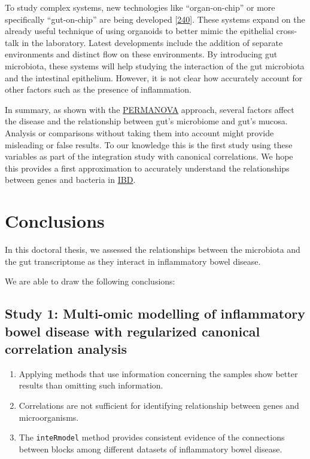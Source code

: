 \documentclass[
  12pt,
  a4paper,
  twoside,
  openright]{book}
\providecommand{\tightlist}{%
  \setlength{\itemsep}{0pt}\setlength{\parskip}{0pt}}
\begin{document}
To study complex systems, new technologies like ``organ-on-chip'' or more specifically ``gut-on-chip'' are being developed {[}\protect\hyperlink{ref-collij2021}{240}{]}.
These systems expand on the already useful technique of using organoids to better mimic the epithelial cross-talk in the laboratory.
Latest developments include the addition of separate environments and distinct flow on these environments.
By introducing gut microbiota, these systems will help studying the interaction of the gut microbiota and the intestinal epithelium.
However, it is not clear how accurately account for other factors such as the presence of inflammation.

In summary, as shown with the \protect\hyperlink{acronyms_PERMANOVA}{PERMANOVA} approach, several factors affect the disease and the relationship between gut's microbiome and gut's mucosa.
Analysis or comparisons without taking them into account might provide misleading or false results.
To our knowledge this is the first study using these variables as part of the integration study with canonical correlations.
We hope this provides a first approximation to accurately understand the relationships between genes and bacteria in \protect\hyperlink{acronyms_IBD}{IBD}.

\hypertarget{conclusions}{%
\chapter{Conclusions}\label{conclusions}}

In this doctoral thesis, we assessed the relationships between the microbiota and the gut transcriptome as they interact in inflammatory bowel disease.

We are able to draw the following conclusions:

\hypertarget{study-1-multi-omic-modelling-of-inflammatory-bowel-disease-with-regularized-canonical-correlation-analysis}{%
\section{Study 1: Multi-omic modelling of inflammatory bowel disease with regularized canonical correlation analysis}\label{study-1-multi-omic-modelling-of-inflammatory-bowel-disease-with-regularized-canonical-correlation-analysis}}

\begin{enumerate}
\def\labelenumi{\arabic{enumi}.}
\tightlist
\item
  Applying methods that use information concerning the samples show better results than omitting such information.
\item
  Correlations are not sufficient for identifying relationship between genes and microorganisms.
\item
  The \texttt{inteRmodel} method provides consistent evidence of the connections between blocks among different datasets of inflammatory bowel disease.
\end{enumerate}
\end{document}
